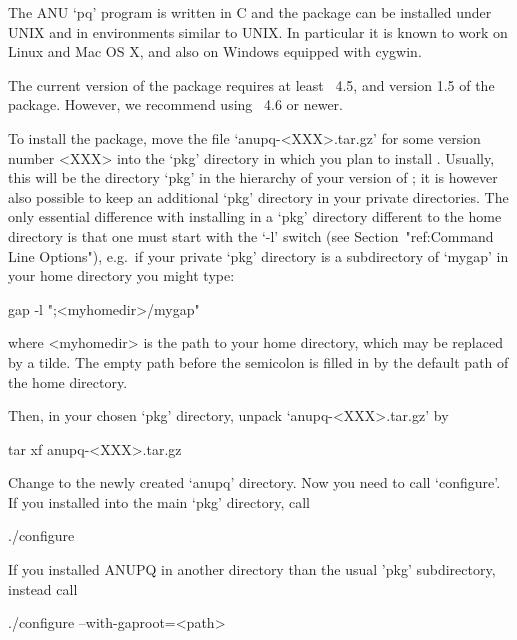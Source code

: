 

The ANU  `pq' program is  written in C  and the package can  be installed
under UNIX  and in environments  similar to UNIX. In particular
it is known to work on Linux and Mac OS X, and also on Windows
equipped with cygwin.

The current version of the  {\ANUPQ}  package  requires at least {\GAP}~4.5,
and version 1.5 of the {\AutPGrp} package. However, we recommend using
{\GAP}~4.6 or newer.

To install the {\ANUPQ} package, move the file `anupq-<XXX>.tar.gz' for some
version number <XXX> into the  `pkg'  directory  in  which  you  plan  to
install {\ANUPQ}. Usually, this  will  be  the  directory  `pkg'  in  the
hierarchy of your version of {\GAP}; it is  however  also  possible  to
keep an additional `pkg' directory in your private directories. The  only
essential difference  with  installing  {\ANUPQ}  in  a  `pkg'  directory
different to the {\GAP} home directory is that one  must  start  {\GAP}
with the `-l' switch (see Section~"ref:Command  Line  Options"),  e.g.~if
your private `pkg' directory is a subdirectory of `mygap'  in  your  home
directory you might type:

gap -l ";<myhomedir>/mygap"

where <myhomedir> is the  path  to  your  home  directory,  which 
may be replaced  by  a  tilde.  The  empty  path  before  the
semicolon is  filled  in  by  the  default  path  of  the  {\GAP}  home
directory.

Then, in your chosen `pkg' directory, unpack `anupq-<XXX>.tar.gz' by

{}tar xf anupq-<XXX>.tar.gz

Change to the newly created `anupq'  directory.  Now  you  need  to  call
`configure'. If you installed {\ANUPQ} into the  main  `pkg'  directory,
call

\begintt
./configure
\endtt

If you installed ANUPQ in another directory than the usual 'pkg'
subdirectory, instead call

\begintt
./configure --with-gaproot=<path>
\endtt

